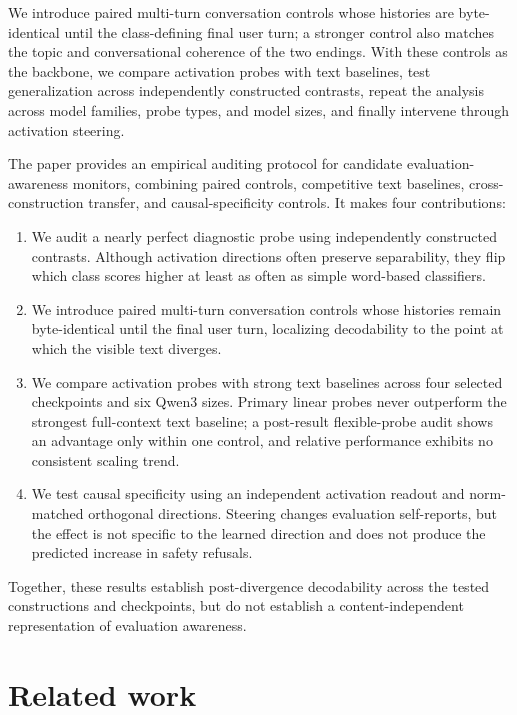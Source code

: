 \documentclass{article}
\begin{document}
We introduce paired multi-turn conversation controls whose histories are
byte-identical until the class-defining final user turn; a stronger control also matches the topic and
conversational coherence of the two endings. With these controls as the
backbone, we compare activation probes with text baselines, test generalization
across independently constructed contrasts, repeat the analysis across model
families, probe types, and model sizes, and finally intervene through activation
steering.

The paper provides an empirical auditing protocol for candidate
evaluation-awareness monitors, combining paired controls, competitive text
baselines, cross-construction transfer, and causal-specificity controls. It
makes four contributions:
\begin{enumerate}
  \item We audit a nearly perfect diagnostic probe using independently
  constructed contrasts. Although activation directions often preserve
  separability, they flip which class scores higher at least as often as simple
  word-based classifiers.
  \item We introduce paired multi-turn conversation controls whose histories
  remain byte-identical until the final user turn, localizing decodability to
  the point at which the visible text diverges.
  \item We compare activation probes with strong text baselines across four
  selected checkpoints and six Qwen3 sizes. Primary linear probes never
  outperform the strongest full-context text baseline; a post-result
  flexible-probe audit shows an advantage only within one control, and relative
  performance exhibits no consistent scaling trend.
  \item We test causal specificity using an independent activation readout and
  norm-matched orthogonal directions. Steering changes evaluation self-reports,
  but the effect is not specific to the learned direction and does not produce
  the predicted increase in safety refusals.
\end{enumerate}
Together, these results establish
post-divergence decodability across the tested constructions and checkpoints,
but do not establish a content-independent representation of evaluation
awareness.

\section{Related work}
\end{document}
